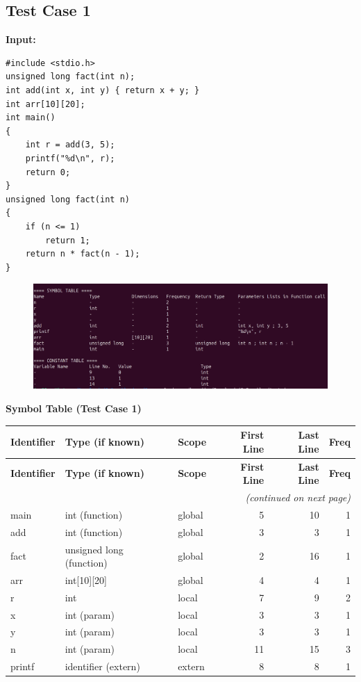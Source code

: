\documentclass[12pt,a4paper]{article}
\begin{document}
\subsection*{Test Case 1}
\textbf{Input:}
\begin{lstlisting}[style=flex]
#include <stdio.h>
unsigned long fact(int n);
int add(int x, int y) { return x + y; }
int arr[10][20];
int main()
{
    int r = add(3, 5);
    printf("%d\n", r);
    return 0;
}
unsigned long fact(int n)
{
    if (n <= 1)
        return 1;
    return n * fact(n - 1);
}
\end{lstlisting}

\begin{figure}[H]
    \centering
    \includegraphics[width=0.9\linewidth]{functions.png}
\end{figure}

\noindent\textbf{Symbol Table (Test Case 1)}
\begin{center}
\begin{longtable}{@{} l l l r r r @{}}\toprule
\textbf{Identifier} & \textbf{Type (if known)} & \textbf{Scope} &
\textbf{First Line} & \textbf{Last Line} & \textbf{Freq} \\
\midrule
\endfirsthead
\toprule
\textbf{Identifier} & \textbf{Type (if known)} & \textbf{Scope} &
\textbf{First Line} & \textbf{Last Line} & \textbf{Freq} \\
\midrule
\endhead
\midrule \multicolumn{6}{r}{\emph{(continued on next page)}}\\
\midrule
\endfoot
\bottomrule
\endlastfoot
main          & int (function)            & global   & 5  & 10 & 1 \\
add           & int (function)            & global   & 3  & 3  & 1 \\
fact          & unsigned long (function)  & global   & 2  & 16 & 1 \\
arr           & int[10][20]               & global   & 4  & 4  & 1 \\
r             & int                       & local    & 7  & 9  & 2 \\
x             & int (param)               & local    & 3  & 3  & 1 \\
y             & int (param)               & local    & 3  & 3  & 1 \\
n             & int (param)               & local    & 11 & 15 & 3 \\
printf        & identifier (extern)       & extern   & 8  & 8  & 1 \\
\end{longtable}
\end{center}
\end{document}
